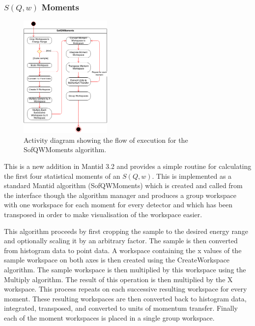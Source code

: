 \documentclass[paper=a4, fontsize=11pt]{scrartcl}	%
\numberwithin{equation}{section}															%
\numberwithin{figure}{section}																%
\numberwithin{table}{section}																%
\begin{document}
\subsubsection{$S(Q,w)$ Moments}
\begin{figure}[H]
\centering
\includegraphics[width=0.4\textwidth]{img/uml/activity_diagrams/SofQWMoments_activity.png}
\caption{Activity diagram showing the flow of execution for the SofQWMoments algorithm.}
\label{fig:c2e-moments-activity-diagram}
\end{figure}

This is a new addition in Mantid 3.2 and provides a simple routine for calculating the first four statistical moments of an $S(Q,w)$. This is implemented as a standard Mantid algorithm (SofQWMoments) which is created and called from the interface though the algorithm manager and produces a group workspace with one workspace for each moment for every detector and which has been transposed in order to make visualisation of the workspace easier.

This algorithm proceeds by first cropping the sample to the desired energy range and optionally scaling it by an arbitrary factor. The sample is then converted from histogram data to point data. A workspace containing the x values of the sample workspace on both axes is then created using the CreateWorkspace algorithm. The sample workspace is then multiplied by this workspace using the Multiply algorithm. The result of this operation is then multiplied by the X workspace. This process repeats on each successive resulting workspace for every moment. These resulting workspaces are then converted back to histogram data, integrated, transposed, and converted to units of momentum transfer. Finally each of the moment workspaces is placed in a single group workspace.
\end{document}
